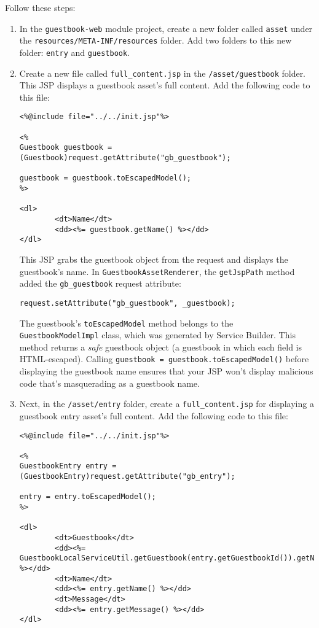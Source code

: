 Follow these steps:

\begin{enumerate}
\def\labelenumi{\arabic{enumi}.}
\item
  In the \texttt{guestbook-web} module project, create a new folder
  called \texttt{asset} under the \texttt{resources/META-INF/resources}
  folder. Add two folders to this new folder: \texttt{entry} and
  \texttt{guestbook}.
\item
  Create a new file called \texttt{full\_content.jsp} in the
  \texttt{/asset/guestbook} folder. This JSP displays a guestbook
  asset's full content. Add the following code to this file:

\begin{verbatim}
<%@include file="../../init.jsp"%>

<%
Guestbook guestbook = (Guestbook)request.getAttribute("gb_guestbook");

guestbook = guestbook.toEscapedModel();
%>

<dl>
        <dt>Name</dt>
        <dd><%= guestbook.getName() %></dd>
</dl>
\end{verbatim}

  This JSP grabs the guestbook object from the request and displays the
  guestbook's name. In \texttt{GuestbookAssetRenderer}, the
  \texttt{getJspPath} method added the \texttt{gb\_guestbook} request
  attribute:

\begin{verbatim}
request.setAttribute("gb_guestbook", _guestbook);
\end{verbatim}

  The guestbook's \texttt{toEscapedModel} method belongs to the
  \texttt{GuestbookModelImpl} class, which was generated by Service
  Builder. This method returns a \emph{safe} guestbook object (a
  guestbook in which each field is HTML-escaped). Calling
  \texttt{guestbook\ =\ guestbook.toEscapedModel()} before displaying
  the guestbook name ensures that your JSP won't display malicious code
  that's masquerading as a guestbook name.
\item
  Next, in the \texttt{/asset/entry} folder, create a
  \texttt{full\_content.jsp} for displaying a guestbook entry asset's
  full content. Add the following code to this file:

\begin{verbatim}
<%@include file="../../init.jsp"%>

<%
GuestbookEntry entry = (GuestbookEntry)request.getAttribute("gb_entry");

entry = entry.toEscapedModel();
%>

<dl>
        <dt>Guestbook</dt>
        <dd><%= GuestbookLocalServiceUtil.getGuestbook(entry.getGuestbookId()).getName() %></dd>
        <dt>Name</dt>
        <dd><%= entry.getName() %></dd>
        <dt>Message</dt>
        <dd><%= entry.getMessage() %></dd>
</dl>
\end{verbatim}
\end{enumerate}

